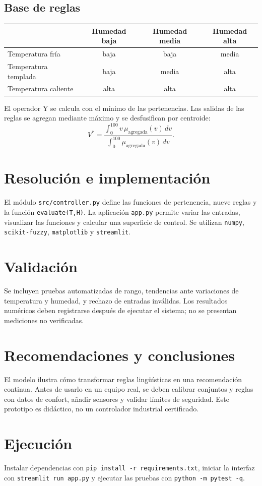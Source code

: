 \documentclass[11pt,letterpaper]{article}
\begin{document}
\subsection{Base de reglas}
\begin{center}\begin{tabular}{lccc}\toprule & Humedad baja & Humedad media & Humedad alta\\\midrule
Temperatura fría & baja & baja & media\\
Temperatura templada & baja & media & alta\\
Temperatura caliente & alta & alta & alta\\\bottomrule\end{tabular}\end{center}
El operador Y se calcula con el mínimo de las pertenencias. Las salidas de las reglas se agregan mediante máximo y se desfusifican por centroide:
\[V^*=\frac{\int_0^{100}v\,\mu_{\mathrm{agregada}}(v)\,dv}{\int_0^{100}\mu_{\mathrm{agregada}}(v)\,dv}.\]
\section{Resolución e implementación}
El módulo \texttt{src/controller.py} define las funciones de pertenencia, nueve reglas y la función \texttt{evaluate(T,H)}. La aplicación \texttt{app.py} permite variar las entradas, visualizar las funciones y calcular una superficie de control. Se utilizan \texttt{numpy}, \texttt{scikit-fuzzy}, \texttt{matplotlib} y \texttt{streamlit}.
\section{Validación}
Se incluyen pruebas automatizadas de rango, tendencias ante variaciones de temperatura y humedad, y rechazo de entradas inválidas. Los resultados numéricos deben registrarse después de ejecutar el sistema; no se presentan mediciones no verificadas.
\section{Recomendaciones y conclusiones}
El modelo ilustra cómo transformar reglas lingüísticas en una recomendación continua. Antes de usarlo en un equipo real, se deben calibrar conjuntos y reglas con datos de confort, añadir sensores y validar límites de seguridad. Este prototipo es didáctico, no un controlador industrial certificado.
\section{Ejecución}
Instalar dependencias con \texttt{pip install -r requirements.txt}, iniciar la interfaz con \texttt{streamlit run app.py} y ejecutar las pruebas con \texttt{python -m pytest -q}.
\end{document}
